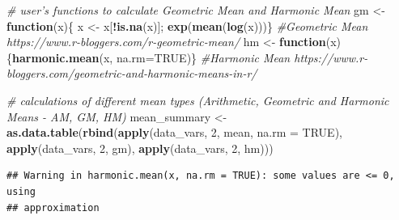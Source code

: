 \documentclass[]{article}
\newenvironment{Shaded}{\begin{snugshade}}{\end{snugshade}}
\newcommand{\KeywordTok}[1]{\textcolor[rgb]{0.13,0.29,0.53}{\textbf{#1}}}
\newcommand{\DataTypeTok}[1]{\textcolor[rgb]{0.13,0.29,0.53}{#1}}
\newcommand{\DecValTok}[1]{\textcolor[rgb]{0.00,0.00,0.81}{#1}}
\newcommand{\StringTok}[1]{\textcolor[rgb]{0.31,0.60,0.02}{#1}}
\newcommand{\CommentTok}[1]{\textcolor[rgb]{0.56,0.35,0.01}{\textit{#1}}}
\newcommand{\OtherTok}[1]{\textcolor[rgb]{0.56,0.35,0.01}{#1}}
\newcommand{\ControlFlowTok}[1]{\textcolor[rgb]{0.13,0.29,0.53}{\textbf{#1}}}
\newcommand{\OperatorTok}[1]{\textcolor[rgb]{0.81,0.36,0.00}{\textbf{#1}}}
\newcommand{\NormalTok}[1]{#1}
\begin{document}
\begin{Shaded}
\begin{Highlighting}[]
\CommentTok{# user's functions to calculate Geometric Mean and Harmonic Mean}
\NormalTok{gm <-}\StringTok{ }\ControlFlowTok{function}\NormalTok{(x)\{  x <-}\StringTok{ }\NormalTok{x[}\OperatorTok{!}\KeywordTok{is.na}\NormalTok{(x)]; }\KeywordTok{exp}\NormalTok{(}\KeywordTok{mean}\NormalTok{(}\KeywordTok{log}\NormalTok{(x)))\} }\CommentTok{#Geometric Mean https://www.r-bloggers.com/r-geometric-mean/}
\NormalTok{hm <-}\StringTok{ }\ControlFlowTok{function}\NormalTok{(x)\{}\KeywordTok{harmonic.mean}\NormalTok{(x, }\DataTypeTok{na.rm=}\OtherTok{TRUE}\NormalTok{)\} }\CommentTok{#Harmonic Mean https://www.r-bloggers.com/geometric-and-harmonic-means-in-r/}

\CommentTok{# calculations of different mean types (Arithmetic, Geometric and Harmonic Means - AM, GM, HM)}
\NormalTok{mean_summary <-}\StringTok{ }\KeywordTok{as.data.table}\NormalTok{(}\KeywordTok{rbind}\NormalTok{(}\KeywordTok{apply}\NormalTok{(data_vars, }\DecValTok{2}\NormalTok{, mean, }\DataTypeTok{na.rm =} \OtherTok{TRUE}\NormalTok{), }\KeywordTok{apply}\NormalTok{(data_vars, }\DecValTok{2}\NormalTok{, gm), }\KeywordTok{apply}\NormalTok{(data_vars, }\DecValTok{2}\NormalTok{, hm)))}
\end{Highlighting}
\end{Shaded}

\begin{verbatim}
## Warning in harmonic.mean(x, na.rm = TRUE): some values are <= 0, using
## approximation
\end{verbatim}
\end{document}

